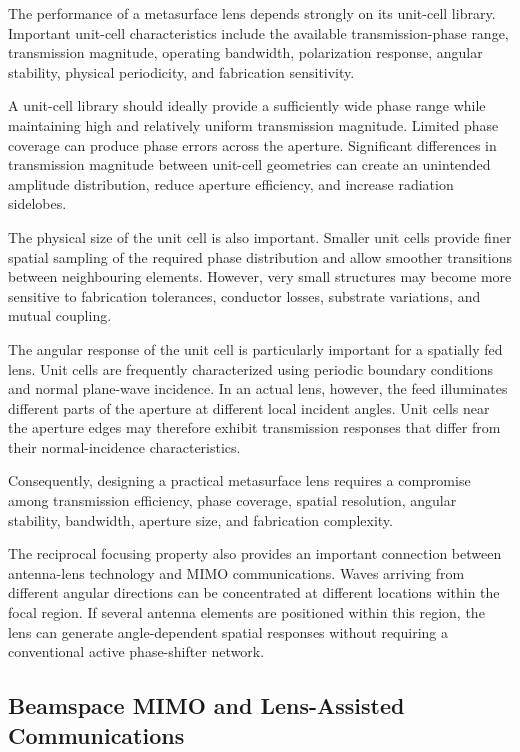 The performance of a metasurface lens depends strongly on its
unit-cell library. Important unit-cell characteristics include the
available transmission-phase range, transmission magnitude,
operating bandwidth, polarization response, angular stability,
physical periodicity, and fabrication sensitivity.

A unit-cell library should ideally provide a sufficiently wide phase
range while maintaining high and relatively uniform transmission
magnitude. Limited phase coverage can produce phase errors across the
aperture. Significant differences in transmission magnitude between
unit-cell geometries can create an unintended amplitude distribution,
reduce aperture efficiency, and increase radiation sidelobes.

The physical size of the unit cell is also important. Smaller unit
cells provide finer spatial sampling of the required phase
distribution and allow smoother transitions between neighbouring
elements. However, very small structures may become more sensitive to
fabrication tolerances, conductor losses, substrate variations, and
mutual coupling.

The angular response of the unit cell is particularly important for a
spatially fed lens. Unit cells are frequently characterized using
periodic boundary conditions and normal plane-wave incidence. In an
actual lens, however, the feed illuminates different parts of the
aperture at different local incident angles. Unit cells near the
aperture edges may therefore exhibit transmission responses that
differ from their normal-incidence characteristics.

Consequently, designing a practical metasurface lens requires a
compromise among transmission efficiency, phase coverage, spatial
resolution, angular stability, bandwidth, aperture size, and
fabrication complexity.

The reciprocal focusing property also provides an important
connection between antenna-lens technology and MIMO communications.
Waves arriving from different angular directions can be concentrated
at different locations within the focal region. If several antenna
elements are positioned within this region, the lens can generate
angle-dependent spatial responses without requiring a conventional
active phase-shifter network.


\subsection{Beamspace MIMO and Lens-Assisted Communications}
\label{subsec:beamspace_mimo}

